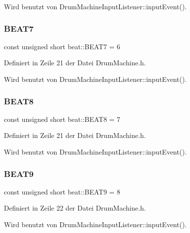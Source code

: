 Wird benutzt von Drum\+Machine\+Input\+Listener\+::input\+Event().

\mbox{\label{namespacebeat_af4ce75f48a22e0f3aacded8385030cad}} 
\subsubsection{\texorpdfstring{B\+E\+A\+T7}{BEAT7}}
{\footnotesize\ttfamily const unsigned short beat\+::\+B\+E\+A\+T7 = 6}



Definiert in Zeile 21 der Datei Drum\+Machine.\+h.



Wird benutzt von Drum\+Machine\+Input\+Listener\+::input\+Event().

\mbox{\label{namespacebeat_a564212b647573e2f3fce876049227d2c}} 
\subsubsection{\texorpdfstring{B\+E\+A\+T8}{BEAT8}}
{\footnotesize\ttfamily const unsigned short beat\+::\+B\+E\+A\+T8 = 7}



Definiert in Zeile 21 der Datei Drum\+Machine.\+h.



Wird benutzt von Drum\+Machine\+Input\+Listener\+::input\+Event().

\mbox{\label{namespacebeat_a6558138490436cdf9a77d90ffd07e092}} 
\subsubsection{\texorpdfstring{B\+E\+A\+T9}{BEAT9}}
{\footnotesize\ttfamily const unsigned short beat\+::\+B\+E\+A\+T9 = 8}



Definiert in Zeile 22 der Datei Drum\+Machine.\+h.



Wird benutzt von Drum\+Machine\+Input\+Listener\+::input\+Event().

